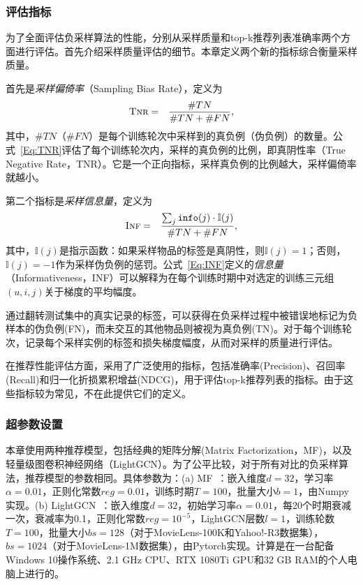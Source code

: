 \subsubsection{评估指标}
为了全面评估负采样算法的性能，分别从采样质量和top-k推荐列表准确率两个方面进行评估。首先介绍采样质量评估的细节。本章定义两个新的指标综合衡量采样质量。

首先是\textit{采样偏倚率}（Sampling Bias Rate），定义为
\begin{eqnarray}
\textsc{Tnr} &=& \frac{\#TN}{\#TN+ \#FN}, \label{Eq:TNR}
\end{eqnarray}
其中，$\#TN$（$\#FN$）是每个训练轮次中采样到的真负例（伪负例）的数量。公式~\eqref{Eq:TNR}评估了每个训练轮次内，采样的真负例的比例，即真阴性率（True Negative Rate，TNR）。它是一个正向指标，采样真负例的比例越大，采样偏倚率就越小。

第二个指标是\textit{采样信息量}，定义为
\begin{eqnarray}
\textsc{Inf} &=& \frac{ \sum_j \mathtt{info}(j) \cdot \mathbb I(j)}{\#TN+ \#FN}, \label{Eq:INF}
\end{eqnarray}
其中，$\mathbb I(j)$是指示函数：如果采样物品的标签是真阴性，则$\mathbb I(j)=1$；否则，$\mathbb I(j)=-1$作为采样伪负例的惩罚。公式~\eqref{Eq:INF}定义的\textit{信息量}（Informativeness，INF）可以解释为在每个训练时期中对选定的训练三元组$(u,i,j)$关于梯度的平均幅度。

通过翻转测试集中的真实记录的标签，可以获得在负采样过程中被错误地标记为负样本的伪负例(FN)，而未交互的其他物品则被视为真负例(TN)。对于每个训练轮次，记录每个采样实例的标签和损失梯度幅度，从而对采样的质量进行评估。

在推荐性能评估方面，采用了广泛使用的指标，包括准确率(Precision)、召回率(Recall)和归一化折损累积增益(NDCG)，用于评估top-k推荐列表的指标。由于这些指标较为常见，不在此提供它们的定义。

\subsubsection{超参数设置}
本章使用两种推荐模型，包括经典的矩阵分解(Matrix Factorization，MF)，以及轻量级图卷积神经网络（LightGCN）\cite{Xiangnan:2020:SIGIR}。为了公平比较，对于所有对比的负采样算法，推荐模型的参数相同。具体参数为：(a) MF~\cite{Xiangnan:2016SIGIR}：嵌入维度$d=32$，学习率$\alpha=0.01$，正则化常数$reg=0.01$，训练时期$T=100$，批量大小$b=1$，由Numpy实现。(b) LightGCN~\cite{Xiangnan:2020:SIGIR}：嵌入维度$d=32$，初始学习率$\alpha=0.01$，每20个时期衰减一次，衰减率为0.1，正则化常数$reg=10^{-5}$，LightGCN层数$l=1$，训练轮数$T=100$，批量大小$bs=128$（对于MovieLens-100K和Yahoo!-R3数据集），$bs=1024$（对于MovieLens-1M数据集），由Pytorch实现。计算是在一台配备Windows 10操作系统、2.1 GHz CPU、RTX 1080Ti GPU和32 GB RAM的个人电脑上进行的。

